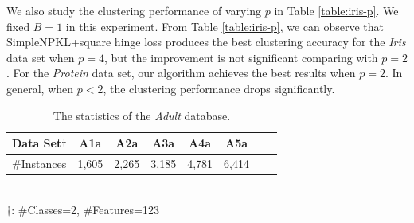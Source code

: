  We also study the clustering performance of varying $p$  in Table \ref{table:iris-p}. We fixed $B=1$ in this experiment. From Table \ref{table:iris-p}, we can observe that SimpleNPKL+square hinge loss produces the best clustering accuracy
for the \emph{Iris} data set when  $p = 4$, but the improvement is not
significant comparing with $p = 2$. For the \emph{Protein} data set, our algorithm achieves the best results when $p=2$.
In general, when $p < 2$, the clustering performance drops
significantly.

\begin{table}[t]
\centering
\begin{center}
\begin{tabular}{c|ccccccr}
\hline Data Set$\dag$ &A1a&A2a&A3a&A4a&A5a\\\hline
$\#$Instances &1,605&2,265&3,185&4,781&6,414\\
\hline
\end{tabular}
\\$\dag$: $\#$Classes=2, $\#$Features=123
\end{center}
\vskip -0.2in
\caption{The statistics of the {\em Adult} database. }
\label{table:adult-set}
\end{table}



